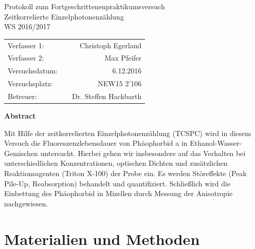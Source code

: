 \documentclass{article}
\begin{document}
\begin{titlepage}
\centering
Protokoll zum Fortgeschrittenenpraktikumsversuch\\[2cm]\Huge
\vfill
\Huge
Zeitkorrelierte Einzelphotonenzählung\\[2cm]\Large
WS 2016/2017 \\
\vfill
\normalsize
\begin{tabular}{lcr}
Verfasser 1:   &   & Christoph Egerland       \\
Verfasser 2:   &   & Max Pfeifer              \\
Versuchsdatum: &   & 6.12.2016                \\
Versuchsplatz: &   & NEW15 2'106              \\
Betreuer:      &   & Dr. Steffen Hackbarth    \\
\end{tabular}
\end{titlepage}

\begin{center}
  \textbf{Abstract}
\end{center}
Mit Hilfe der zeitkorrelierten Einzelphotonenzählung (TCSPC) wird in diesem Versuch die Fluoreszenzlebensdauer von Phäophorbid a in Ethanol-Wasser-Gemischen untersucht.
Hierbei gehen wir insbesondere auf das Verhalten bei unterschiedlichen Konzentrationen, optischen Dichten und
zusätzlichen Reaktionsagenten (Triton X-100) der Probe ein. Es werden Störeffekte (Peak Pile-Up, Reabsorption) behandelt und quantifiziert.
Schließlich wird die Einbettung des Phäophorbid in Mizellen durch Messung der Anisotropie nachgewiesen.

\tableofcontents
\newpage


\section{Materialien und Methoden}
\end{document}
